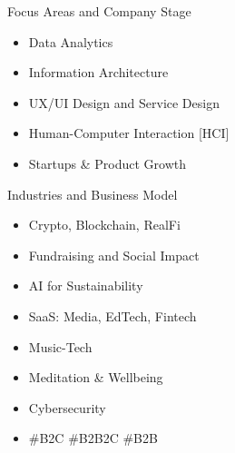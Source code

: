 

Focus Areas and Company Stage
\vspace*{-0.8em}
\begin{itemize}
 \setlength\itemsep{-0.3em}
\item Data Analytics
\item Information Architecture
\item UX/UI Design and Service Design
\item Human-Computer Interaction [HCI]
\item Startups \& Product Growth
\end{itemize}

Industries and Business Model
\vspace*{-0.8em}
\begin{itemize}
 \setlength\itemsep{-0.3em}
\item Crypto, Blockchain, RealFi
\item Fundraising and Social Impact
\item AI for Sustainability
\item
SaaS:
Media,
EdTech,
Fintech
\item Music-Tech
\item Meditation \& Wellbeing
\item Cybersecurity
\item \#B2C \#B2B2C \#B2B
\end{itemize}


